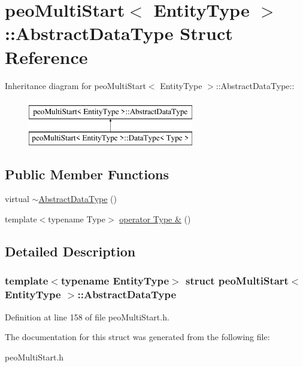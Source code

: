 \hypertarget{structpeoMultiStart_1_1AbstractDataType}{
\section{peo\-Multi\-Start$<$ Entity\-Type $>$::Abstract\-Data\-Type Struct Reference}
\label{structpeoMultiStart_1_1AbstractDataType}
}
Inheritance diagram for peo\-Multi\-Start$<$ Entity\-Type $>$::Abstract\-Data\-Type::\begin{figure}[H]
\begin{center}
\leavevmode
\includegraphics[height=2cm]{structpeoMultiStart_1_1AbstractDataType}
\end{center}
\end{figure}
\subsection*{Public Member Functions}
\begin{CompactItemize}
\item 
\hypertarget{structpeoMultiStart_1_1AbstractDataType_d1ff4bf7da5330c7f4395f9e3c9c29bd}{
virtual \hyperlink{structpeoMultiStart_1_1AbstractDataType_d1ff4bf7da5330c7f4395f9e3c9c29bd}{$\sim$Abstract\-Data\-Type} ()}
\label{structpeoMultiStart_1_1AbstractDataType_d1ff4bf7da5330c7f4395f9e3c9c29bd}

\item 
\hypertarget{structpeoMultiStart_1_1AbstractDataType_e5fe4d7fa98c492bc748176780790d93}{
template$<$typename Type$>$ \hyperlink{structpeoMultiStart_1_1AbstractDataType_e5fe4d7fa98c492bc748176780790d93}{operator Type \&} ()}
\label{structpeoMultiStart_1_1AbstractDataType_e5fe4d7fa98c492bc748176780790d93}

\end{CompactItemize}


\subsection{Detailed Description}
\subsubsection*{template$<$typename Entity\-Type$>$ struct peo\-Multi\-Start$<$ Entity\-Type $>$::Abstract\-Data\-Type}





Definition at line 158 of file peo\-Multi\-Start.h.

The documentation for this struct was generated from the following file:\begin{CompactItemize}
\item 
peo\-Multi\-Start.h\end{CompactItemize}
